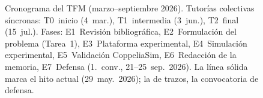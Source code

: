 \begin{figure}[htbp]
\begin{tikzpicture}[x=1.55cm, y=0.72cm]
\end{tikzpicture}
\caption[Cronograma del TFM]%
{Cronograma del TFM (marzo--septiembre 2026).
Tutorías colectivas síncronas: T0~inicio (4~mar.), T1~intermedia (3~jun.),
T2~final (15~jul.).
Fases: E1~Revisión bibliográfica, E2~Formulación del problema (Tarea~1),
E3~Plataforma experimental, E4~Simulación experimental,
E5~Validación CoppeliaSim, E6~Redacción de la memoria,
E7~Defensa (1.\textordfeminine\ conv., 21--25~sep.\ 2026).
La línea sólida marca el hito actual (29~may.\ 2026); la de trazos,
la convocatoria de defensa.}
\label{fig:gantt}
\end{figure}
